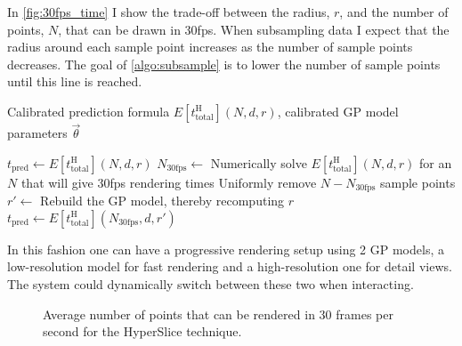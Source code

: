 In \autoref{fig:30fps_time} I show the trade-off between the radius, $r$, and the
number of points, $N$, that can be drawn in 30fps.  When subsampling data I
expect that the radius around each sample point increases as the number of
sample points decreases.
The goal of \autoref{algo:subsample} is to 
lower the number of sample points until this line is reached.

\begin{algorithm}
  \caption[Subsampling data to achieve interactive rendering time]{%
    A proposed algorithm for subsampling data in order to achieve
    interactive rendering times using the Gaussian process model
    with the HyperSlice rendering technique.
  }
  \label{algo:subsample}
  \begin{algorithmic}
    \Require Calibrated prediction formula $E[t_\text{total}^\text{H}](N, d, r)$,
             calibrated GP model parameters $\vec{\theta}$

    \State $t_\text{pred} \gets E[t_\text{total}^\text{H}](N, d, r)$\;
      \State $N_\text{30fps} \gets$ Numerically solve $E[t_\text{total}^\text{H}](N, d, r)$ for an $N$ that will give 30fps rendering times\;
      \State Uniformly remove $N - N_\text{30fps}$ sample points\;
      \State $r' \gets$ Rebuild the GP model, thereby recomputing $r$\;
      \State $t_\text{pred} \gets E[t_\text{total}^\text{H}](N_\text{30fps}, d, r')$\;
    \EndWhile
  \end{algorithmic}
\end{algorithm}

In this fashion one can have a progressive rendering setup using 2 GP models, 
a low-resolution model for fast rendering and a high-resolution one for
detail views.  The system could dynamically switch between these two when
interacting.

\begin{figure}[h]
  \centering
  
  \caption[Interactive rendering times for various dimensions]{%
    Average number of points that can be rendered in 30 frames per 
    second for the HyperSlice technique.
  }
  \label{fig:30fps_time}
\end{figure}

